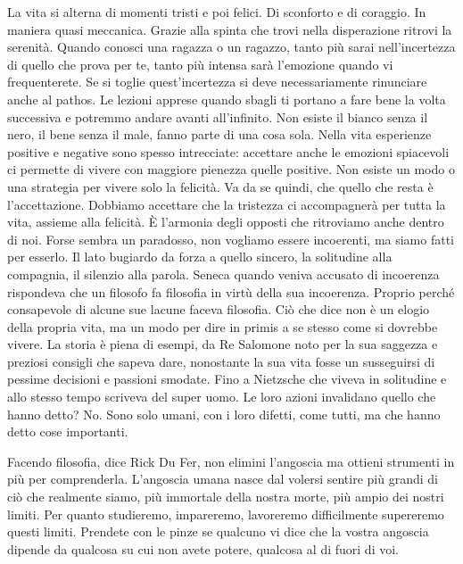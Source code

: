 \documentclass[12pt]{book} %
\begin{document}
La vita si alterna di momenti tristi e poi felici. Di sconforto e di coraggio. In maniera quasi meccanica. Grazie alla
spinta che trovi nella disperazione ritrovi la serenità. Quando conosci una ragazza o un ragazzo, tanto più sarai
nell'incertezza di quello che prova per te, tanto più intensa sarà l'emozione
quando vi frequenterete. Se si toglie quest'incertezza si deve necessariamente rinunciare anche al
pathos. Le lezioni apprese quando sbagli ti portano a fare bene la volta successiva e potremmo andare avanti
all'infinito. Non esiste il bianco senza il nero, il bene senza il male, fanno parte di una cosa
sola. Nella vita esperienze positive e negative sono spesso intrecciate: accettare anche le emozioni spiacevoli ci permette di vivere con maggiore pienezza quelle positive. Non esiste un
modo o una strategia per vivere solo la felicità. Va da se quindi, che quello che resta è
l'accettazione. Dobbiamo accettare che la tristezza ci accompagnerà per tutta la vita, assieme
alla felicità. È l'armonia degli opposti che ritroviamo anche dentro di noi. Forse sembra un
paradosso, non vogliamo essere incoerenti, ma siamo fatti per esserlo. Il lato bugiardo da forza a quello sincero, la
solitudine alla compagnia, il silenzio alla parola. Seneca quando veniva accusato di incoerenza rispondeva che un
filosofo fa filosofia in virtù della sua incoerenza. Proprio perché consapevole di alcune sue lacune faceva filosofia.
Ciò che dice non è un elogio della propria vita, ma un modo per dire in primis a se stesso come si dovrebbe vivere. La
storia è piena di esempi, da Re Salomone noto per la sua saggezza e preziosi consigli che sapeva dare, nonostante la
sua vita fosse un susseguirsi di pessime decisioni e passioni smodate. Fino a Nietzsche che viveva in solitudine e
allo stesso tempo scriveva del super uomo. Le loro azioni invalidano quello che hanno detto? No. Sono solo umani, con i
loro difetti, come tutti, ma che hanno detto cose importanti.

Facendo filosofia, dice Rick Du Fer, non elimini l'angoscia ma ottieni strumenti in più per comprenderla. L'angoscia
umana nasce dal volersi sentire più grandi di ciò che realmente siamo, più immortale della nostra morte, più ampio dei
nostri limiti. Per quanto studieremo, impareremo, lavoreremo difficilmente supereremo questi limiti. Prendete con le pinze se qualcuno
vi dice che la vostra angoscia dipende da qualcosa su cui non avete potere, qualcosa al di fuori di voi.
\end{document}
